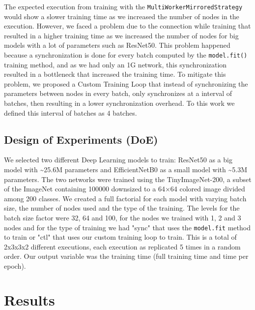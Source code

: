 \documentclass[format=acmsmall, review=false, screen=true]{acmart}
\begin{document}
The expected execution from training with the
\texttt{MultiWorkerMirroredStrategy} would show a slower training time as we
increased the number of nodes in the execution. However, we faced a
problem due to the connection while training that resulted in a higher
training time as we increased the number of nodes for big models with
a lot of parameters such as ResNet50. This problem happened because a
synchronization is done for every batch computed by the \texttt{model.fit()}
training method, and as we had only an 1G network, this
synchronization resulted in a bottleneck that increased the training
time. To mitigate this problem, we proposed a Custom Training Loop
that instead of synchronizing the parameters between nodes in every
batch, only synchronizes at a interval of batches, then resulting in a
lower synchronization overhead. To this work we defined this
interval of batches as 4 batches.

\subsection{Design of Experiments (DoE)}
\label{sec:org87b0f02}

We selected two different Deep Learning models to train: \alert{ResNet50}
\cite{resnet} as a big model with \textasciitilde{}25.6M parameters and
\alert{EfficientNetB0}\cite{efficientNet} as a small model with \textasciitilde{}5.3M
parameters. The two networks were trained using the TinyImageNet-200,
a subset of the ImageNet\cite{imagenet} containing 100000 downsized to
a 64×64 colored image divided among 200 classes. We created a full
factorial for each model with varying batch size, the number of nodes
used and the type of the training. The levels for the batch size
factor were 32, 64 and 100, for the nodes we trained with 1, 2 and 3
nodes and for the type of training we had "sync" that uses the
\texttt{model.fit} method to train or "ctl" that uses our custom training loop
to train. This is a total of 2x3x3x2 different executions, each
execution as replicated 5 times in a random order. Our output variable
was the training time (full training time and time per epoch).


\section{Results}
\label{sec:org84026f7}
\end{document}
